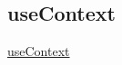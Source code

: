 \subsection{useContext}
\href{https://dmitripavlutin.com/react-context-and-usecontext/}{useContext}
